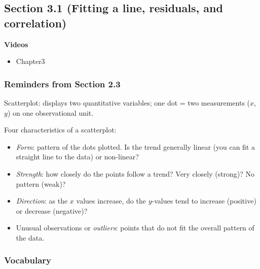 \documentclass[
]{report}
\providecommand{\tightlist}{%
  \setlength{\itemsep}{0pt}\setlength{\parskip}{0pt}}
\begin{document}
\hypertarget{section-3.1-fitting-a-line-residuals-and-correlation}{%
\subsection*{Section 3.1 (Fitting a line, residuals, and correlation)}\label{section-3.1-fitting-a-line-residuals-and-correlation}}


\textbf{Videos}

\begin{itemize}
\tightlist
\item
  Chapter3
\end{itemize}


\hypertarget{reminders-from-section-2.3}{%
\subsubsection*{Reminders from Section 2.3}\label{reminders-from-section-2.3}}

Scatterplot: displays two quantitative variables; one dot = two measurements (\(x\), \(y\)) on one observational unit.

Four characteristics of a scatterplot:

\begin{itemize}
\tightlist
\item
  \emph{Form}: pattern of the dots plotted. Is the trend generally linear (you can fit a straight line to the data) or non-linear?\\
\item
  \emph{Strength}: how closely do the points follow a trend? Very closely (strong)? No pattern (weak)?\\
\item
  \emph{Direction}: as the \(x\) values increase, do the \(y\)-values tend to increase (positive) or decrease (negative)?\\
\item
  Unusual observations or \emph{outliers}: points that do not fit the overall pattern of the data.
\end{itemize}


\hypertarget{vocabulary-6}{%
\subsubsection*{Vocabulary}\label{vocabulary-6}}
\end{document}

